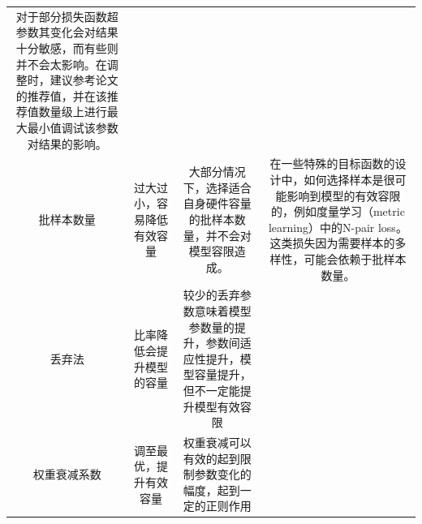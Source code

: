 \begin{longtable}[]{@{}cccc@{}}
\begin{minipage}[t]{0.31\columnwidth}
对于部分损失函数超参数其变化会对结果十分敏感，而有些则并不会太影响。在调整时，建议参考论文的推荐值，并在该推荐值数量级上进行最大最小值调试该参数对结果的影响。\strut
\end{minipage}\tabularnewline
\begin{minipage}[t]{0.10\columnwidth}\centering\strut
批样本数量\strut
\end{minipage} & \begin{minipage}[t]{0.17\columnwidth}\centering\strut
过大过小，容易降低有效容量\strut
\end{minipage} & \begin{minipage}[t]{0.31\columnwidth}\centering\strut
大部分情况下，选择适合自身硬件容量的批样本数量，并不会对模型容限造成。\strut
\end{minipage} & \begin{minipage}[t]{0.31\columnwidth}\centering\strut
在一些特殊的目标函数的设计中，如何选择样本是很可能影响到模型的有效容限的，例如度量学习（metric
learning）中的N-pair
loss。这类损失因为需要样本的多样性，可能会依赖于批样本数量。\strut
\end{minipage}\tabularnewline
\begin{minipage}[t]{0.10\columnwidth}\centering\strut
丢弃法\strut
\end{minipage} & \begin{minipage}[t]{0.17\columnwidth}\centering\strut
比率降低会提升模型的容量\strut
\end{minipage} & \begin{minipage}[t]{0.31\columnwidth}\centering\strut
较少的丢弃参数意味着模型参数量的提升，参数间适应性提升，模型容量提升，但不一定能提升模型有效容限\strut
\end{minipage} & \begin{minipage}[t]{0.31\columnwidth}\centering\strut
\strut
\end{minipage}\tabularnewline
\begin{minipage}[t]{0.10\columnwidth}\centering\strut
权重衰减系数\strut
\end{minipage} & \begin{minipage}[t]{0.17\columnwidth}\centering\strut
调至最优，提升有效容量\strut
\end{minipage} & \begin{minipage}[t]{0.31\columnwidth}\centering\strut
权重衰减可以有效的起到限制参数变化的幅度，起到一定的正则作用\strut
\end{minipage} & \begin{minipage}[t]{0.31\columnwidth}\centering\strut
\strut

\end{minipage}
\end{longtable}
